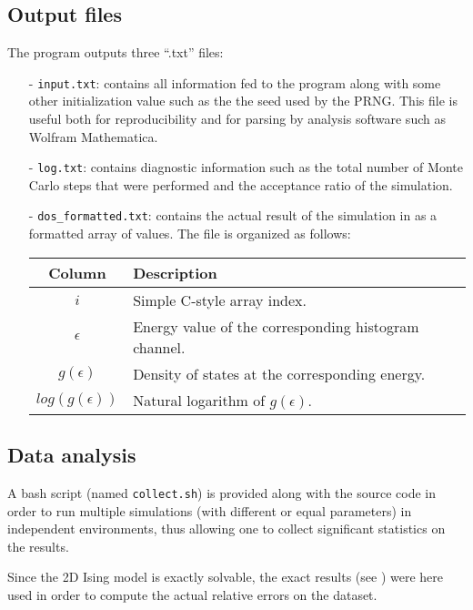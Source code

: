 \documentclass[11pt]{article}
\begin{document}
\subsection*{Output files}
The program outputs three ``.txt'' files:
\begin{itemize}
	\item[-] \verb|input.txt|: contains all information fed to the program along with some other initialization value such as the the seed used by the PRNG. This file is useful both for reproducibility and for parsing by analysis software such as Wolfram Mathematica.
	\item[-] \verb|log.txt|: contains diagnostic information such as the total number of Monte Carlo steps that were performed and the acceptance ratio of the simulation.
	\item[-] \verb|dos_formatted.txt|: contains the actual result of the simulation in as a formatted array of values. The file is organized as follows:\\
	\begin{center}\begin{tabular}{cl}
	\toprule
	Column				&	Description												\\
	\midrule
	$i$					&	Simple C-style array index.								\\
	$\epsilon$			&	Energy value of the corresponding histogram channel.	\\
	$g(\epsilon)$		&	Density of states at the corresponding energy.			\\
	$log(g(\epsilon))$	&	Natural logarithm of $g(\epsilon)$.						\\
	\bottomrule
	\end{tabular}\end{center}
\end{itemize}

\subsection*{Data analysis}

A bash script (named \verb|collect.sh|) is provided along with the source code in order to run multiple simulations (with different or equal parameters) in independent environments, thus allowing one to collect significant statistics on the results.

Since the 2D Ising model is exactly solvable, the exact results (see \cite{bib:exact}) were here used in order to compute the actual relative errors on the dataset.
\end{document}
